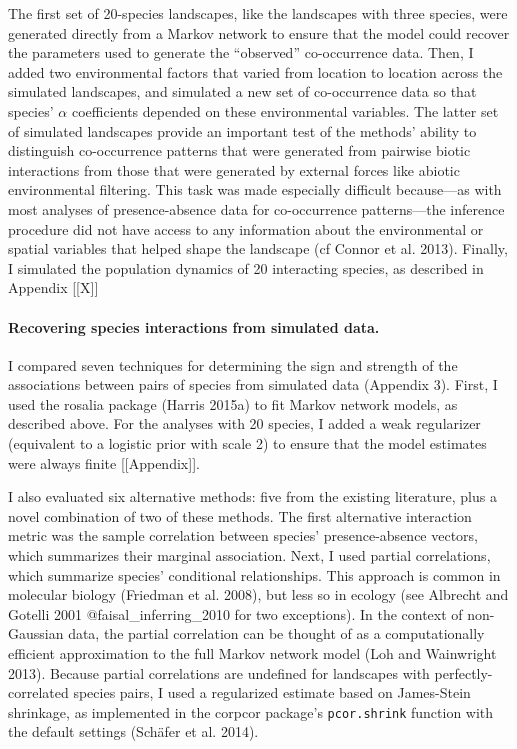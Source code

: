 \documentclass[12pt,]{article}
\begin{document}
\begin{spacing}{1.9}
\begin{flushleft}
The first set of 20-species landscapes, like the landscapes with three
species, were generated directly from a Markov network to ensure that
the model could recover the parameters used to generate the ``observed''
co-occurrence data. Then, I added two environmental factors that varied
from location to location across the simulated landscapes, and simulated
a new set of co-occurrence data so that species' \(\alpha\) coefficients
depended on these environmental variables. The latter set of simulated
landscapes provide an important test of the methods' ability to
distinguish co-occurrence patterns that were generated from pairwise
biotic interactions from those that were generated by external forces
like abiotic environmental filtering. This task was made especially
difficult because---as with most analyses of presence-absence data for
co-occurrence patterns---the inference procedure did not have access to
any information about the environmental or spatial variables that helped
shape the landscape (cf Connor et al. 2013). Finally, I simulated the
population dynamics of 20 interacting species, as described in Appendix
{[}{[}X{]}{]}

\paragraph{Recovering species interactions from simulated
data.}\label{recovering-species-interactions-from-simulated-data.}

I compared seven techniques for determining the sign and strength of the
associations between pairs of species from simulated data (Appendix 3).
First, I used the rosalia package (Harris 2015a) to fit Markov network
models, as described above. For the analyses with 20 species, I added a
weak regularizer (equivalent to a logistic prior with scale 2) to ensure
that the model estimates were always finite {[}{[}Appendix{]}{]}.

I also evaluated six alternative methods: five from the existing
literature, plus a novel combination of two of these methods. The first
alternative interaction metric was the sample correlation between
species' presence-absence vectors, which summarizes their marginal
association. Next, I used partial correlations, which summarize species'
conditional relationships. This approach is common in molecular biology
(Friedman et al. 2008), but less so in ecology (see Albrecht and Gotelli
2001 @faisal\_inferring\_2010 for two exceptions). In the context of
non-Gaussian data, the partial correlation can be thought of as a
computationally efficient approximation to the full Markov network model
(Loh and Wainwright 2013). Because partial correlations are undefined
for landscapes with perfectly-correlated species pairs, I used a
regularized estimate based on James-Stein shrinkage, as implemented in
the corpcor package's \texttt{pcor.shrink} function with the default
settings (Schäfer et al. 2014).


\end{flushleft}
\end{spacing}
\end{document}
